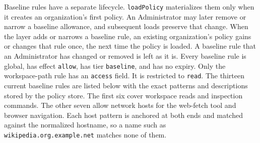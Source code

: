 Baseline rules have a separate lifecycle. \texttt{loadPolicy} materializes
them only when it creates an organization's first policy. An Administrator may
later remove or narrow a baseline allowance, and subsequent loads preserve
that change. {\color{red}When the layer adds or narrows a baseline rule, an
existing organization's policy gains or changes that rule once, the next time
the policy is loaded. A baseline rule that an Administrator has changed or
removed is left as it is.} Every baseline rule is global, has effect \texttt{allow}, has tier
\texttt{baseline}, and has no expiry. Only the workspace-path rule has an
\texttt{access} field. It is restricted to \texttt{read}. {\color{red}The
thirteen current baseline rules are listed below with the exact patterns and
descriptions stored by the policy store. The first six cover workspace reads
and inspection commands. The other seven allow network hosts for the web-fetch
tool and browser navigation. Each host pattern is anchored at both ends and
matched against the normalized hostname, so a name such as
\texttt{wikipedia.org.example.net} matches none of them.}

